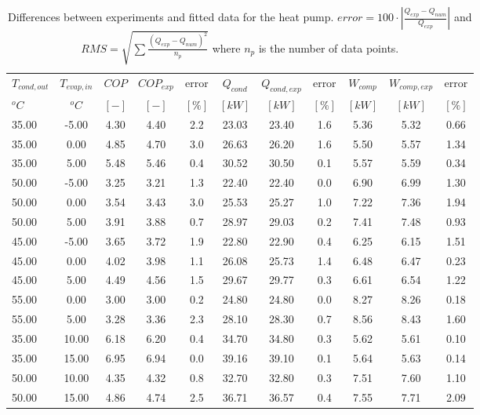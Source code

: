 \documentclass[english]{SPFShortReport}
\begin{document}
\begin{table}[!ht]
\begin{small}
\caption{Differences between experiments and fitted data for the heat pump.          $error=100 \cdot |\frac{Q_{exp}-Q_{num}}{Q_{exp}}|$ and $RMS = \sqrt { \sum{\frac{(Q_{exp}-Q_{num})^2}{n_p}} }$ where $n_p$ is the number of data points.}
\begin{center}
\resizebox{12cm}{!} 
{
\begin{tabular}{l | c c c c c c c c c c } 
\hline
\hline
$T_{cond,out}$ &$T_{evap,in}$ &$COP$ &$COP_{exp}$ &error &$Q_{cond}$ &$Q_{cond,exp}$ &error &$W_{comp}$ &$W_{comp,exp}$ &error \\ 
$^oC$ &$^oC$ &$[-]$ &$[-]$ &$[\%]$ &$[kW]$ &$[kW]$ &$[\%]$ &$[kW]$ &$[kW]$ &$[\%]$\\ 
\hline
35.00  & -5.00 & 4.30 & 4.40 & 2.2 & 23.03 & 23.40 & 1.6 & 5.36 & 5.32 & 0.66\\ 
35.00  & 0.00 & 4.85 & 4.70 & 3.0 & 26.63 & 26.20 & 1.6 & 5.50 & 5.57 & 1.34\\ 
35.00  & 5.00 & 5.48 & 5.46 & 0.4 & 30.52 & 30.50 & 0.1 & 5.57 & 5.59 & 0.34\\ 
50.00  & -5.00 & 3.25 & 3.21 & 1.3 & 22.40 & 22.40 & 0.0 & 6.90 & 6.99 & 1.30\\ 
50.00  & 0.00 & 3.54 & 3.43 & 3.0 & 25.53 & 25.27 & 1.0 & 7.22 & 7.36 & 1.94\\ 
50.00  & 5.00 & 3.91 & 3.88 & 0.7 & 28.97 & 29.03 & 0.2 & 7.41 & 7.48 & 0.93\\ 
45.00  & -5.00 & 3.65 & 3.72 & 1.9 & 22.80 & 22.90 & 0.4 & 6.25 & 6.15 & 1.51\\ 
45.00  & 0.00 & 4.02 & 3.98 & 1.1 & 26.08 & 25.73 & 1.4 & 6.48 & 6.47 & 0.23\\ 
45.00  & 5.00 & 4.49 & 4.56 & 1.5 & 29.67 & 29.77 & 0.3 & 6.61 & 6.54 & 1.22\\ 
55.00  & 0.00 & 3.00 & 3.00 & 0.2 & 24.80 & 24.80 & 0.0 & 8.27 & 8.26 & 0.18\\ 
55.00  & 5.00 & 3.28 & 3.36 & 2.3 & 28.10 & 28.30 & 0.7 & 8.56 & 8.43 & 1.60\\ 
35.00  & 10.00 & 6.18 & 6.20 & 0.4 & 34.70 & 34.80 & 0.3 & 5.62 & 5.61 & 0.10\\ 
35.00  & 15.00 & 6.95 & 6.94 & 0.0 & 39.16 & 39.10 & 0.1 & 5.64 & 5.63 & 0.14\\ 
50.00  & 10.00 & 4.35 & 4.32 & 0.8 & 32.70 & 32.80 & 0.3 & 7.51 & 7.60 & 1.10\\ 
50.00  & 15.00 & 4.86 & 4.74 & 2.5 & 36.71 & 36.57 & 0.4 & 7.55 & 7.71 & 2.09\\ 

\end{tabular}}
\end{center}
\end{small}
\end{table}
\end{document}
